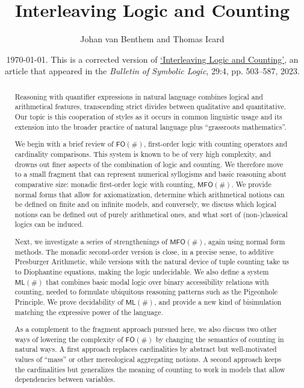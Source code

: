 \documentclass[12pt,oneside,reqno]{amsart}
\title{Interleaving Logic and Counting}
\author{Johan van Benthem and Thomas Icard}
\date{\today. This is a corrected version of \href{https://www.cambridge.org/core/journals/bulletin-of-symbolic-logic/article/interleaving-logic-and-counting/E8C36FFD28218F157BE9D150D7B55AA6}{`Interleaving Logic and Counting'}, an article that appeared in the \emph{Bulletin of Symbolic Logic}, 29:4, pp. 503--587, 2023.}
\theoremstyle{definition}
\begin{document}
\maketitle %

\begin{abstract} Reasoning with quantifier expressions in natural language combines logical and arithmetical features, transcending strict divides between qualitative and quantitative. Our topic is this cooperation of styles as it occurs in common linguistic usage and its extension into the broader practice of natural language plus ``grassroots mathematics''. 

We begin with a brief review of $\mathsf{FO}(\#)$, first-order logic with counting operators and cardinality comparisons. This system is known to be of very high complexity, and drowns out finer aspects of the combination of logic and counting. We therefore move to a small fragment that can represent numerical syllogisms and basic reasoning about comparative size: monadic first-order logic with counting, $\mathsf{MFO}(\#)$. We provide normal forms that allow for axiomatization, determine which arithmetical notions can be defined on finite and on infinite models, and conversely, we discuss which logical notions can be defined out of purely arithmetical ones, and what sort of (non-)classical logics can be induced.

Next, we investigate a series of strengthenings of $\mathsf{MFO}(\#)$, again using  normal form methods. The monadic second-order version is close, in a precise sense, to additive Presburger Arithmetic, while versions with the natural device of tuple counting take us to Diophantine equations, making the logic undecidable. We also define a system $\mathsf{ML}(\#)$ that combines basic modal logic over binary accessibility relations with counting, needed to formulate ubiquitous reasoning patterns such as the Pigeonhole Principle. We prove decidability of $\mathsf{ML}(\#)$, and provide a new kind of bisimulation matching the expressive power of the  language. 

As a complement to the fragment approach pursued here, we also discuss two other ways of lowering the complexity of $\mathsf{FO}(\#)$ by changing the semantics of counting in natural ways. A first approach  replaces cardinalities by abstract but well-motivated values of ``mass'' or other mereological aggregating notions. A second approach keeps the cardinalities but generalizes the meaning of counting to work in models that allow dependencies between variables.
  

\end{abstract}
\end{document}
